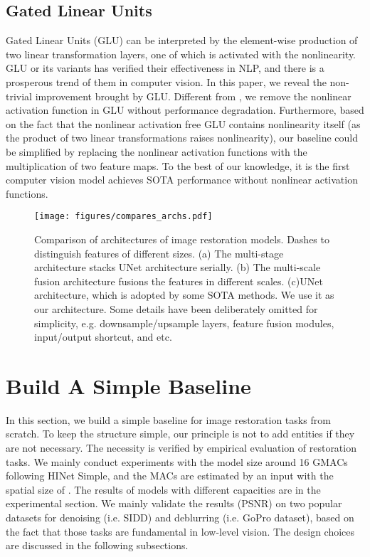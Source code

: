 \documentclass[runningheads]{llncs}
\begin{document}
\subsection{Gated Linear Units}
Gated Linear Units\cite{dauphin2017language} (GLU) can be interpreted by the element-wise production of two linear transformation layers, one of which is activated with the nonlinearity. GLU or its variants has verified their effectiveness in NLP\cite{shazeer2020glu,dauphin2017language,dai2019transformer}, and there is a prosperous trend of them in computer vision\cite{tu2022maxim,zamir2021restormer,hua2022transformer,liang2022vrt}. 
In this paper, we reveal the non-trivial improvement brought by GLU. Different from \cite{shazeer2020glu}, we remove the nonlinear activation function in GLU without performance degradation.
Furthermore, based on the fact that the nonlinear activation free GLU contains nonlinearity itself (as the product of two linear transformations raises nonlinearity), our baseline could be simplified by replacing the nonlinear activation functions with the multiplication of two feature maps. To the best of our knowledge, it is the first computer vision model achieves SOTA performance without nonlinear activation functions. 



\begin{figure*}[!t]
\texttt{[image: figures/compares\_archs.pdf]}
\caption{Comparison of architectures of image restoration models. Dashes to distinguish features of different sizes. (a) The multi-stage architecture\cite{chen2021hinet,waqas2021multi} stacks UNet architecture serially. (b) The multi-scale fusion architecture\cite{mao2021deep,cho2021rethinking} fusions the features in different scales. (c)UNet architecture, which is adopted by some SOTA methods\cite{zamir2021restormer,wang2021uformer}. We use it as our architecture. Some details have been deliberately omitted for simplicity, e.g. downsample/upsample layers, feature fusion modules, input/output shortcut, and etc. }
\label{fig:compares-archs}
\end{figure*}



\section{Build A Simple Baseline}
In this section, we build a simple baseline for image restoration tasks from scratch.  To keep the structure simple, our principle is not to add entities if they are not necessary. The necessity is verified by empirical evaluation of restoration tasks.
We mainly conduct experiments with the model size around 16 GMACs following HINet Simple\cite{chen2021hinet}, and the MACs are estimated by an input with the spatial size of . The results of models with different capacities are in the experimental section. We mainly validate the results (PSNR) on two popular datasets for denoising (i.e. SIDD\cite{SIDD_2018_CVPR}) and deblurring (i.e. GoPro\cite{nah2017deep} dataset), based on the fact that those tasks are fundamental in low-level vision. The design choices are discussed in the following subsections.
\end{document}
